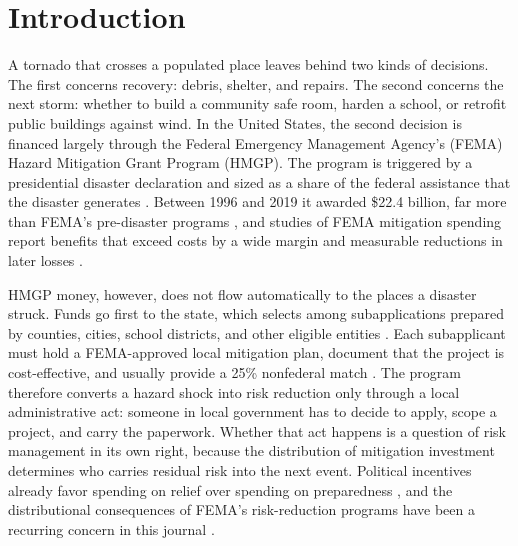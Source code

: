 \documentclass[12pt]{article}
\begin{document}
\linenumbers
\setcounter{page}{3}

\section{Introduction}

A tornado that crosses a populated place leaves behind two kinds of decisions. The first concerns recovery: debris, shelter, and repairs. The second concerns the next storm: whether to build a community safe room, harden a school, or retrofit public buildings against wind. In the United States, the second decision is financed largely through the Federal Emergency Management Agency's (FEMA) Hazard Mitigation Grant Program (HMGP). The program is triggered by a presidential disaster declaration and sized as a share of the federal assistance that the disaster generates \parencite{horn2022crs}. Between 1996 and 2019 it awarded \$22.4 billion, far more than FEMA's pre-disaster programs \parencite{horn2022crs}, and studies of FEMA mitigation spending report benefits that exceed costs by a wide margin \parencite{rose2007bca,godschalk2009foresight} and measurable reductions in later losses \parencite{davlasheridze2017adaptation,miao2025loss}.

HMGP money, however, does not flow automatically to the places a disaster struck. Funds go first to the state, which selects among subapplications prepared by counties, cities, school districts, and other eligible entities \parencite{horn2022crs}. Each subapplicant must hold a FEMA-approved local mitigation plan, document that the project is cost-effective, and usually provide a 25\% nonfederal match \parencite{horn2022crs,frimpong2023federal}. The program therefore converts a hazard shock into risk reduction only through a local administrative act: someone in local government has to decide to apply, scope a project, and carry the paperwork. Whether that act happens is a question of risk management in its own right, because the distribution of mitigation investment determines who carries residual risk into the next event. Political incentives already favor spending on relief over spending on preparedness \parencite{healy2009myopic}, and the distributional consequences of FEMA's risk-reduction programs have been a recurring concern in this journal \parencite{noonan2018flood,miao2025equity}.
\end{document}
